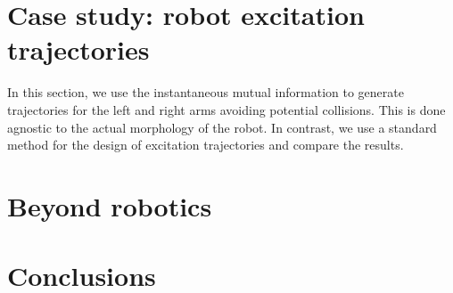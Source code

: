 \section{Case study: robot excitation trajectories}
\TODO
In this section, we use the instantaneous mutual information to generate trajectories for the left and right arms avoiding potential collisions. This is done agnostic to the actual morphology of the robot. In contrast, we use a standard method for the design of excitation trajectories and compare the results.

\section{Beyond robotics}
\TODO
{}

\section{Conclusions}\label{sec:conclusion}



\printbibliography 
